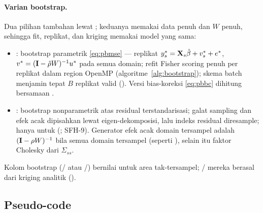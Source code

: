 \paragraph{Varian bootstrap.} Dua pilihan tambahan lewat
; keduanya memakai data penuh dan $W$ penuh, sehingga fit,
replikat, dan kriging memakai model yang sama:
\begin{itemize}
  \item {}: bootstrap parametrik \eqref{eq:pbmse} --- replikat
        $y^\ast_s=\mathbf{X}_s\hat\beta+v^\ast_s+e^\ast$,
        $v^\ast=(\mathbf{I}-\hat\rho W)^{-1}u^\ast$ pada semua domain; refit
        Fisher scoring penuh per replikat dalam region OpenMP
        (algoritme~\ref{alg:bootstrap}); skema batch menjamin tepat $B$
        replikat valid (). Versi
        bias-koreksi \eqref{eq:pbbc} dihitung bersamaan
        \citep{molina2009bootstrap}.
  \item {}: bootstrap nonparametrik atas residual
        terstandarisasi; galat sampling dan efek acak dipisahkan lewat
        eigen-dekomposisi, lalu indeks residual diresample; hanya untuk
         (;
        SFH-9). Generator efek acak domain tersampel adalah
        $(\mathbf{I}-\rho W)^{-1}$ bila semua domain tersampel (seperti
        ), selain itu faktor Cholesky dari
        $\Sigma_{ss}$.
\end{itemize}
Kolom bootstrap (/ atau
/) bernilai  untuk area
tak-tersampel; / mereka berasal dari kriging analitik
().

\subsection{Pseudo-code}\label{sec:sfh-algo}

